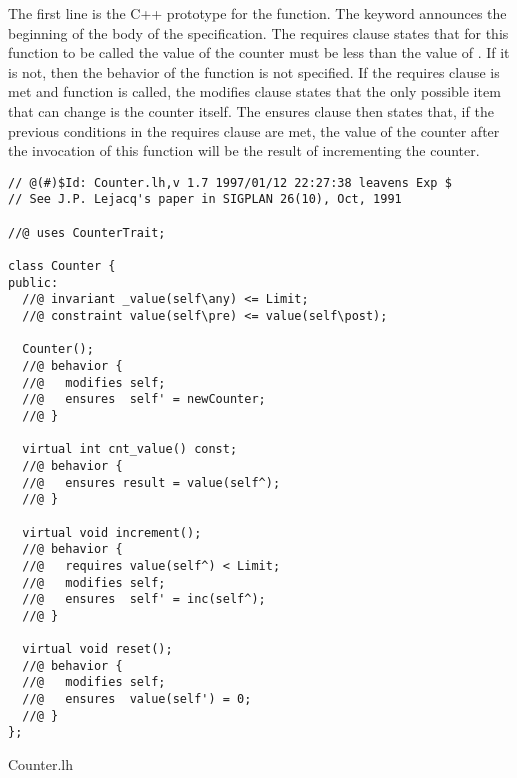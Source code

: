 \noindent The first line is the C++ prototype for the function. The
 keyword announces the beginning of the body of the
specification. The requires clause states that for this function to be
called the value of the counter must be less than the value of
. If it is not, then the behavior of the function is
not specified. If the requires clause is met and function is called,
the modifies clause states that the only possible item that can change
is the counter itself. The ensures clause then states that, if the
previous conditions in the requires clause are met, the value of the counter after the
invocation of this function will be the result of incrementing the
counter. 
 
\begin{BFIGURE}
\begin{verbatim}
// @(#)$Id: Counter.lh,v 1.7 1997/01/12 22:27:38 leavens Exp $
// See J.P. Lejacq's paper in SIGPLAN 26(10), Oct, 1991

//@ uses CounterTrait;

class Counter {
public:
  //@ invariant _value(self\any) <= Limit;
  //@ constraint value(self\pre) <= value(self\post);

  Counter();
  //@ behavior {
  //@   modifies self;
  //@   ensures  self' = newCounter;
  //@ }

  virtual int cnt_value() const;
  //@ behavior {
  //@   ensures result = value(self^);
  //@ }

  virtual void increment();
  //@ behavior {
  //@   requires value(self^) < Limit;
  //@   modifies self;
  //@   ensures  self' = inc(self^);
  //@ }

  virtual void reset();
  //@ behavior {
  //@   modifies self;
  //@   ensures  value(self') = 0;
  //@ }
};

\end{verbatim}
\caption{Counter.lh}
\label{CounterSpec}
\end{BFIGURE}
